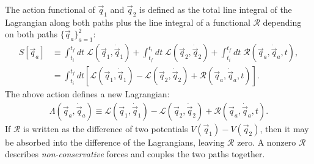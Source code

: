 The action functional of $\vec{q}_1$ and $\vec{q}_2$ is defined as the total line integral of the Lagrangian along both paths plus the line integral of a functional $\mathcal{R}$ depending on both paths $\{\vec{q}_a\}_{a=1}^2$:
\begin{align}
S[\vec{q}_a] &\equiv \int_{t_i}^{t_f} dt \; \mathcal{L} (\vec{q}_1, \dot{\vec{q}}_1) + \int_{t_f}^{t_i} dt \;  \mathcal{L} (\vec{q}_2, \dot{\vec{q}}_2)  + \int_{t_i}^{t_f} dt \; \mathcal{R} (\vec{q}_a, \dot{\vec{q}}_a, t),  \\
&= \int_{t_i}^{t_f} dt [\mathcal{L} (\vec{q}_1, \dot{\vec{q}}_1)  - \mathcal{L}(\vec{q}_2, \dot{\vec{q}}_2) + \mathcal{R} (\vec{q}_a, \dot{\vec{q}}_a, t) ].
\end{align}
The above action defines a new Lagrangian:
\begin{align}
\Lambda (\vec{q}_a, \dot{\vec{q}}_a) \equiv  \mathcal{L} (\vec{q}_1, \dot{\vec{q}}_1) - \mathcal{L} (\vec{q}_2, \dot{\vec{q}}_2) + \mathcal{R} (\vec{q}_a, \dot{\vec{q}}_a, t).
\label{eq:action}
\end{align}
If $\mathcal{R}$ is written as the difference of two potentials $V(\vec{q}_1) - V(\vec{q}_2)$, then it may be absorbed into the difference of the Lagrangians, leaving $\mathcal{R}$ zero.  A nonzero $\mathcal{R}$ describes {\em non-conservative} forces and couples the two paths together.


